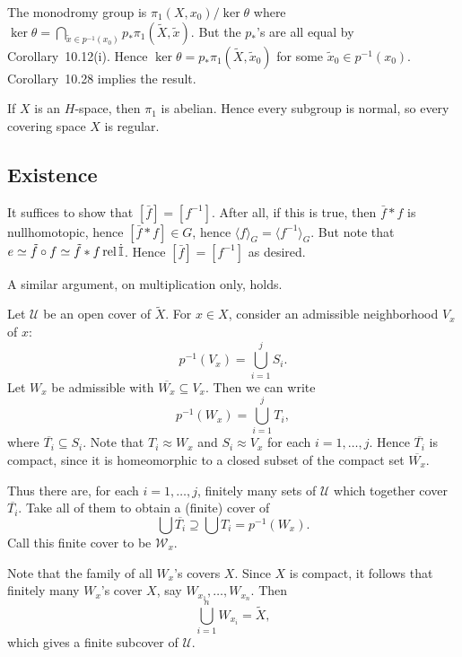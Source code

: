 \documentclass[../../solutions.tex]{subfiles}
\begin{document}
\begin{exercise} \leavevmode
The monodromy group is $\pi_1(X,x_0)/\ker\theta$ where $\ker\theta=\bigcap_{\tilde x\in p^{-1}(x_0)}p_*\pi_1(\widetilde X,\tilde x)$.
But the $p_*$'s are all equal by Corollary~10.12(i).
Hence $\ker\theta=p_*\pi_1(\widetilde X,\tilde x_0)$ for some $\tilde x_0\in p^{-1}(x_0)$.
Corollary~10.28 implies the result.
\end{exercise}

\begin{exercise} \leavevmode
If $X$ is an $H$-space, then $\pi_1$ is abelian.
Hence every subgroup is normal, so every covering space $X$ is regular.
\end{exercise}

\subsection{Existence}
\begin{exercise} \leavevmode
It suffices to show that $[\bar f]=[f^{-1}]$.
After all, if this is true, then $\bar f*f$ is nullhomotopic, hence $[\bar f*f]\in G$, hence $\langle f\rangle_G=\langle f^{-1}\rangle_G$.
But note that $e\simeq\tilde f\circ f\simeq\tilde f*f\operatorname{rel}\dot{\mathbb I}$.
Hence $[\bar f]=[f^{-1}]$ as desired.
\end{exercise}

\begin{exercise} \leavevmode
A similar argument, on multiplication only, holds.
\end{exercise}

\begin{exercise} \leavevmode
Let $\mathcal U$ be an open cover of $\widetilde X$.
For $x\in X$, consider an admissible neighborhood $V_x$ of $x$:
\[p^{-1}(V_x)=\bigcup_{i=1}^jS_i.\]
Let $W_x$ be admissible with $\overline{W_x}\subseteq V_x$.
Then we can write
\[p^{-1}(W_x)=\bigcup_{i=1}^jT_i,\]
where $\overline{T_i}\subseteq S_i$.
Note that $T_i\approx W_x$ and $S_i\approx V_x$ for each $i=1,\dots,j$.
Hence $\overline{T_i}$ is compact, since it is homeomorphic to a closed subset of the compact set $\overline{W_x}$.

Thus there are, for each $i=1,\dots,j$, finitely many sets of $\mathcal U$ which together cover $\overline{T_i}$.
Take all of them to obtain a (finite) cover of
\[\bigcup\overline{T_i}\supseteq\bigcup T_i=p^{-1}(W_x).\]
Call this finite cover to be $\mathcal W_x$.

Note that the family of all $W_x$'s covers $X$.
Since $X$ is compact, it follows that finitely many $W_x$'s cover $X$, say $W_{x_1},\dots,W_{x_n}$.
Then
\[\bigcup_{i=1}^nW_{x_i}=\widetilde X,\]
which gives a finite subcover of $\mathcal U$.
\end{exercise}
\end{document}
